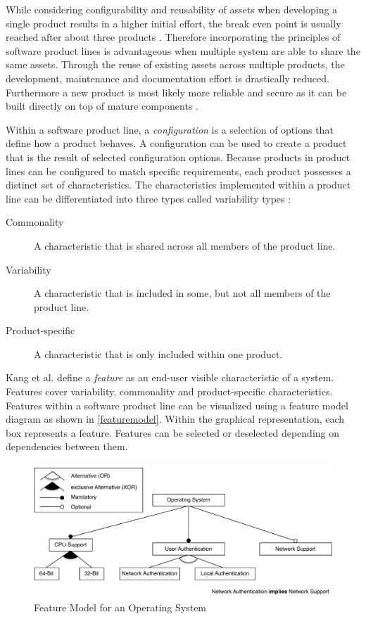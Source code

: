 \documentclass[a4paper]{article}
\begin{document}
While considering configurability and reusability of assets when developing a single product results in a higher initial effort, the break even point is usually reached after about three products \cite[p.4]{spl-in-action} \cite[p.10]{Pohl:2005:SPL:1095605}. Therefore incorporating the principles of software product lines is advantageous when multiple system are able to share the same assets. Through the reuse of existing assets across multiple products, the development, maintenance and documentation effort is drastically reduced. Furthermore a new product is most likely more reliable and secure as it can be built directly on top of mature components  \cite[p.4f]{spl-in-action}. 

Within a software product line, a \emph{configuration} is a selection of options that define how a product behaves. A configuration can be used to create a product that is the result of selected configuration options.
Because products in product lines can be configured to match specific requirements, each product possesses a distinct set of characteristics. The characteristics implemented within a product line can be differentiated into three types called variability types \cite[p.8]{spl-in-action}:
\begin{description}
\item[Commonality]  A characteristic that is shared across all members of the product line.
\item[Variability]  A characteristic that is included in some, but not all members of the product line.
\item[Product-specific]  A characteristic that is only included within one product. 
\end{description}

Kang et al. \cite{KangFeatureOrientedDomain1990} define a \emph{feature} as an end-user visible characteristic of a system. Features cover variability, commonality and product-specific characteristics. Features within a software product line can be visualized using a feature model diagram as shown in \autoref{featuremodel}. Within the graphical representation, each box represents a feature. Features can be selected or deselected depending on dependencies between them.

\begin{figure}[h] 
  \centering
  \begin{minipage}[b]{1\textwidth} 
    \caption[Feature Model]{Feature Model for an Operating System}\label{featuremodel}
    \includegraphics[width=1\textwidth]{img/featuremodel.pdf}
  \end{minipage}
\end{figure}
\end{document}
